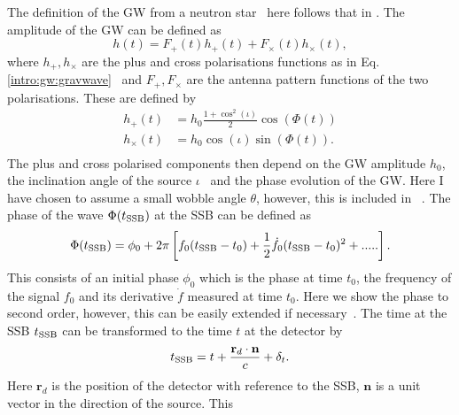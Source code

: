 The definition of the \gls{GW} from a neutron star~ here follows that in
\citep{riles2017RecentSearches,schutz1998DataAnalysis,dupuis2005BayesianEstimation}.
The amplitude of the \gls{GW} can be defined as
%
\begin{equation}
\label{intro:cw:ht}
h(t) = F_+(t)h_{+}(t) +F_{\times}(t)h_{\times}(t),
\end{equation}
%
where $h_{+},h_{\times}$ are the plus and cross polarisations functions as in
Eq.\ref{intro:gw:gravwave}~ and $F_{+},F_{\times}$ are the antenna pattern
functions of the two polarisations. These are defined by
%
\begin{equation}
\label{intro:cw:amplitudes}
    \begin{split}
        h_{+}(t) &=  h_0 \frac{1 + \cos^2{(\iota)}}{2}\cos{\left(\Phi(t)\right)} \\
        h_{\times}(t) &= h_0  \cos{(\iota)} \sin{\left( \Phi(t)\right) }. \\
    \end{split}
\end{equation}
%
The plus and cross polarised components then depend on the \gls{GW} amplitude
$h_0$, the inclination angle of the source $\iota$~ and the phase evolution of
the \gls{GW}. Here I have chosen to assume a small wobble angle $\theta$,
however, this is included in \citep{schutz1998DataAnalysis}~.
The phase of the wave $\Phi(t_{{\rm SSB}})$ at the \gls{SSB} can be defined as
%
\begin{equation}
\label{searchcw:model:phase}
    \Phi(t_{{\rm SSB}}) = \phi_0 + 2\pi\left[ f_0(t_{{\rm SSB}} - t_0) + \frac{1}{2} \dot{f_0} (t_{{\rm SSB}} - t_0)^2 + .....\right] .
\end{equation}
%
This consists of an initial phase $\phi_0$ which is the phase at time $t_0$,
the frequency of the signal $f_0$ and its derivative ${\dot{f}}$ measured at
time $t_0$. Here we show the phase to second order, however, this can be easily
extended if necessary~. The time at the \gls{SSB} $t_{{\rm SSB}}$ can be
transformed to the time $t$ at the detector by
%
\begin{equation}
	\label{searchcw:model:ssbtime}
t_{{\rm SSB}} = t + \frac{\mathbf{r}_d \cdot \mathbf{n}}{c} + \delta_t.
\end{equation}
%
Here $\mathbf{r}_d$ is the position of the detector with reference to the
\gls{SSB}, $\mathbf{n}$ is a unit vector in the direction of the source. This
